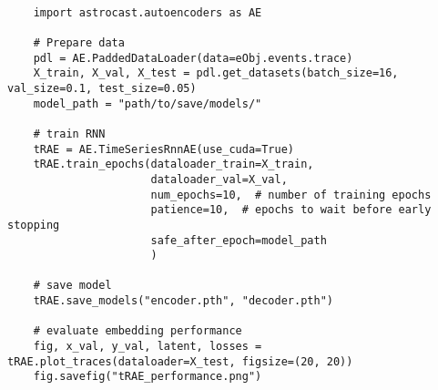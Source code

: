 \begin{lstlisting}[style=pyStyle]

    import astrocast.autoencoders as AE

    # Prepare data
    pdl = AE.PaddedDataLoader(data=eObj.events.trace)
    X_train, X_val, X_test = pdl.get_datasets(batch_size=16, val_size=0.1, test_size=0.05)
    model_path = "path/to/save/models/"

    # train RNN
    tRAE = AE.TimeSeriesRnnAE(use_cuda=True)
    tRAE.train_epochs(dataloader_train=X_train,
                      dataloader_val=X_val,
                      num_epochs=10,  # number of training epochs
                      patience=10,  # epochs to wait before early stopping
                      safe_after_epoch=model_path
                      )

    # save model
    tRAE.save_models("encoder.pth", "decoder.pth")

    # evaluate embedding performance
    fig, x_val, y_val, latent, losses = tRAE.plot_traces(dataloader=X_test, figsize=(20, 20))
    fig.savefig("tRAE_performance.png")

\end{lstlisting}

